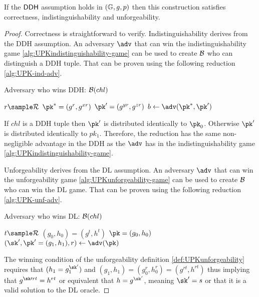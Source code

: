 If the $\textup{\textsf{DDH}}$ assumption holds in $(\mathbb{G}, g, p)$ then this construction satisfies correctness, indistinguishability and unforgeability.

\begin{proof}
Correctness is straightforward to verify. Indistinguishability derives from the DDH assumption. An adversary $\adv$ that can win the indistinguishability game \ref{alg:UPKindistinguishability-game} can be used to create $\mathcal{B}$ who can distinguish a DDH tuple. That can be proven using the following reduction \ref{alg:UPK-ind-adv}. 

\begin{algorithm}[htbp]
    \caption{Adversary who wins DDH: $\mathcal{B}(chl)$}
    \label{alg:UPK-ind-adv}
    \DontPrintSemicolon
    \SetAlgoLined
    \BlankLine
    $r \sample \randspace$\;
    $\pk^* = (g^r, g^{xr})$\;
    $\pk^\prime = (g^{yr}, g^{zr})$\;
    $b \gets \adv(\pk^*, \pk^\prime)$\;

\end{algorithm}
If $chl$ is a DDH tuple then $\pk^\prime$ is distributed identically to $\pk_0$. Otherwise $\pk^\prime$ is distributed identically to $pk_1$. Therefore, the reduction has the same non-negligible advantage in the DDH as the $\adv$ has in the indistinguishability game \ref{alg:UPKindistinguishability-game}.

Unforgeability derives from the DL assumption. An adversary $\adv$ that can win the unforgeability game \ref{alg:UPKunforgeability-game} can be used to create $\mathcal{B}$ who can win the DL game. That can be proven using the following reduction \ref{alg:UPK-unf-adv}. 

\begin{algorithm}[htbp]
    \caption{Adversary who wins DL: $\mathcal{B}(chl)$}
    \label{alg:UPK-unf-adv}
    \DontPrintSemicolon
    \SetAlgoLined
    \BlankLine
    $t \sample \randspace$\;
    $(g_0, h_0) = (g^t, h^t)$\;
    $\pk = (g_0, h_0)$\;
    $(\sk^\prime, \pk^\prime = (g_1, h_1), r) \gets \adv(\pk)$\;
    \Return{$\sk^\prime$}

\end{algorithm}
The winning condition of the unforgeability definition \ref{def:UPKunforgeability} requires that $(h_1 = g_1 ^ {\sk^\prime})$ and $(g_1, h_1) = (g_0^r, h_0^r) = (g^{rt}, h^{rt})$ thus implying that $g^{\sk\prime r t} = h^{rt}$ or equivalent that $h = g^{\sk^\prime}$, meaning $\sk^\prime = s$ or that it is a valid solution to the DL oracle.

\end{proof}

